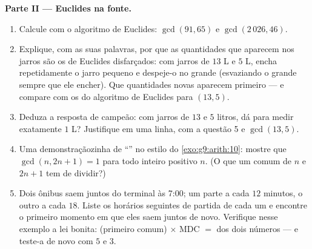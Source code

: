 \begin{problem}
\medskip
\noindent\textbf{Parte II --- Euclides na fonte.}
\begin{enumerate}[resume]
  \item Calcule com o algoritmo de Euclides: $\gcd(91, 65)$ e
        $\gcd(2\,026, 46)$.
  \item Explique, com as suas palavras, por que as quantidades que
        aparecem nos jarros são os  de Euclides disfarçados: com
        jarros de $13$ L e $5$ L, encha repetidamente o jarro pequeno e
        despeje-o no grande (esvaziando o grande sempre que ele
        encher). Que quantidades novas aparecem primeiro --- e compare
        com os  do algoritmo de Euclides para $(13, 5)$.
  \item Deduza a resposta de campeão: com jarros de $13$ e $5$ litros,
        dá para medir exatamente $1$ L? Justifique em uma linha, com a
        questão 5 e $\gcd(13, 5)$.
  \item Uma demonstraçãozinha de ``'' no estilo do
        \cref{exo:g9:arith:10}: mostre que $\gcd(n, 2n + 1) = 1$ para
        todo inteiro positivo $n$. (O que um  comum de $n$ e
        $2n + 1$ tem de dividir?)
  \item Dois ônibus saem juntos do terminal às 7:00; um parte a cada
        $12$ minutos, o outro a cada $18$. Liste os horários seguintes
        de partida de cada um e encontre o primeiro momento em que eles
        saem juntos de novo. Verifique nesse exemplo a lei bonita:
        (primeiro  comum) $\times$ MDC $=$  dos dois
        números --- e teste-a de novo com $5$ e $3$.
\end{enumerate}


\end{problem}
